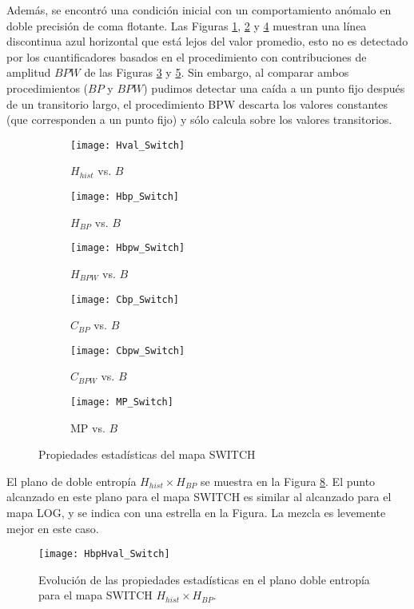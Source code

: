 Además, se encontró una condición inicial con un comportamiento anómalo en doble precisión de coma flotante.
Las Figuras \ref{fig:Hval_Switch}, \ref{fig:Hbp_Switch} y \ref{fig:Cbp_Switch} muestran una línea discontinua azul horizontal que está lejos del valor promedio, esto no es detectado por los cuantificadores basados en el procedimiento con contribuciones de amplitud $BPW$ de las Figuras \ref{fig:Hbpw_Switch} y \ref{fig:Cbpw_Switch}.
Sin embargo, al comparar ambos procedimientos ($BP$ y $BPW$) pudimos detectar una caída a un punto fijo después de un transitorio largo, el procedimiento BPW descarta los valores constantes (que corresponden a un punto fijo) y sólo calcula sobre los valores transitorios.
%
\begin{figure}[htpb]
	\centering
	\begin{subfigure}[b]{0.49\textwidth}
		\texttt{[image: Hval\_Switch]}
		\caption{$H_{hist}$ vs. $B$}
		\label{fig:Hval_Switch}
	\end{subfigure}
	\begin{subfigure}[b]{0.49\textwidth}
		\texttt{[image: Hbp\_Switch]}
		\caption{$H_{BP}$ vs. $B$}
		\label{fig:Hbp_Switch}
	\end{subfigure}
	\begin{subfigure}[b]{0.49\textwidth}
		\texttt{[image: Hbpw\_Switch]}
		\caption{$H_{BPW}$ vs. $B$}
		\label{fig:Hbpw_Switch}
	\end{subfigure}
	\begin{subfigure}[b]{0.49\textwidth}
		\texttt{[image: Cbp\_Switch]}
		\caption{$C_{BP}$ vs. $B$}
		\label{fig:Cbp_Switch}
	\end{subfigure}
	\begin{subfigure}[b]{0.49\textwidth}
		\texttt{[image: Cbpw\_Switch]}
		\caption{$C_{BPW}$ vs. $B$}
		\label{fig:Cbpw_Switch}
	\end{subfigure}
	\begin{subfigure}[b]{0.49\textwidth}
		\texttt{[image: MP\_Switch]}
		\caption{MP vs. $B$}
		\label{fig:MP_Switch}
	\end{subfigure}
	\caption{Propiedades estadísticas del mapa SWITCH}
	\label{fig:SWITCH_QuantiB}
\end{figure}

El plano de doble entropía $H_{hist} \times H_{BP}$ se muestra en la Figura \ref{fig:SWITCH_HH}.
El punto alcanzado en este plano para el mapa SWITCH es similar al alcanzado para el mapa LOG, y se indica con una estrella en la Figura.
La mezcla es levemente mejor en este caso.
%
\begin{figure}[htpb]
	\centering
	\texttt{[image: HbpHval\_Switch]}
	\caption{Evolución de las propiedades estadísticas en el plano doble entropía para el mapa SWITCH $H_{hist} \times H_{BP}$.}
	\label{fig:SWITCH_HH}
\end{figure}

